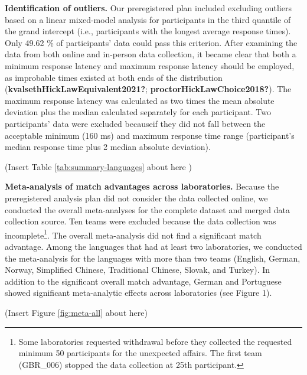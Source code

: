\documentclass[
  man,floatsintext]{apa6}
\begin{document}
\textbf{Identification of outliers.} Our preregistered plan included excluding outliers based on a linear mixed-model analysis for participants in the third quantile of the grand intercept (i.e., participants with the longest average response times). Only 49.62 \% of participants' data could pass this criterion. After examining the data from both online and in-person data collection, it became clear that both a minimum response latency and maximum response latency should be employed, as improbable times existed at both ends of the distribution (\textbf{kvalsethHickLawEquivalent2021?}; \textbf{proctorHickLawChoice2018?}). The maximum response latency was calculated as two times the mean absolute deviation plus the median calculated separately for each participant. Two participants' data were excluded becauseif they did not fall between the acceptable minimum (160 ms) and maximum response time range (participant's median response time plus 2 median absolute deviation).

(Insert Table \ref{tab:summary-languages} about here )

\textbf{Meta-analysis of match advantages across laboratories.} Because the preregistered analysis plan did not consider the data collected online, we conducted the overall meta-analyses for the complete dataset and merged data collection source. Ten teams were excluded because the data collection was incomplete\footnote{Some laboratories requested withdrawal before they collected the requested minimum 50 participants for the unexpected affairs. The first team (GBR\_006) stopped the data collection at 25th participant.}. The overall meta-analysis did not find a significant match advantage. Among the languages that had at least two laboratories, we conducted the meta-analysis for the languages with more than two teams (English, German, Norway, Simplified Chinese, Traditional Chinese, Slovak, and Turkey). In addition to the significant overall match advantage, German and Portuguese showed significant meta-analytic effects across laboratories (see Figure 1).

(Insert Figure \ref{fig:meta-all} about here)
\end{document}
